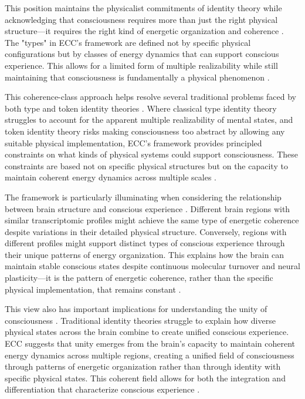 \begin{refsection}
This position maintains the physicalist commitments of identity theory while acknowledging that consciousness requires more than just the right physical structure—it requires the right kind of energetic organization and coherence \cite{richardson2008multiple}. The "types" in ECC's framework are defined not by specific physical configurations but by classes of energy dynamics that can support conscious experience. This allows for a limited form of multiple realizability while still maintaining that consciousness is fundamentally a physical phenomenon \cite{kim1992multiple}.

This coherence-class approach helps resolve several traditional problems faced by both type and token identity theories \cite{lewis1966argument}. Where classical type identity theory struggles to account for the apparent multiple realizability of mental states, and token identity theory risks making consciousness too abstract by allowing any suitable physical implementation, ECC's framework provides principled constraints on what kinds of physical systems could support consciousness. These constraints are based not on specific physical structures but on the capacity to maintain coherent energy dynamics across multiple scales \cite{wilson2001two}.

The framework is particularly illuminating when considering the relationship between brain structure and conscious experience \cite{block1972what}. Different brain regions with similar transcriptomic profiles might achieve the same type of energetic coherence despite variations in their detailed physical structure. Conversely, regions with different profiles might support distinct types of conscious experience through their unique patterns of energy organization. This explains how the brain can maintain stable conscious states despite continuous molecular turnover and neural plasticity—it is the pattern of energetic coherence, rather than the specific physical implementation, that remains constant \cite{polger2009evaluating}.

This view also has important implications for understanding the unity of consciousness \cite{craver2007explaining}. Traditional identity theories struggle to explain how diverse physical states across the brain combine to create unified conscious experience. ECC suggests that unity emerges from the brain's capacity to maintain coherent energy dynamics across multiple regions, creating a unified field of consciousness through patterns of energetic organization rather than through identity with specific physical states. This coherent field allows for both the integration and differentiation that characterize conscious experience \cite{feigl1967mental}.


\end{refsection}
